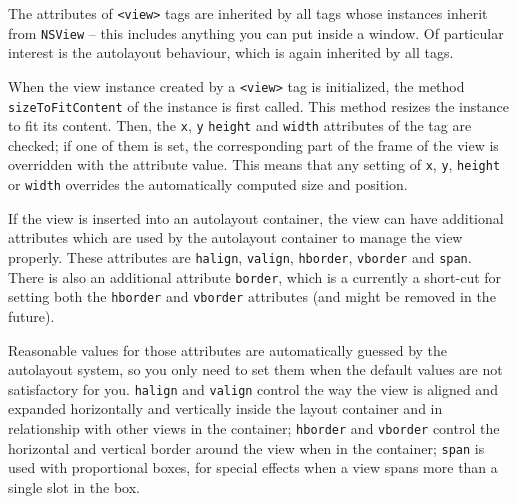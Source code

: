 The attributes of \texttt{<view>} tags are inherited by all tags whose
instances inherit from \texttt{NSView} -- this includes anything you
can put inside a window.  Of particular interest is the autolayout
behaviour, which is again inherited by all tags.

When the view instance created by a \texttt{<view>} tag is
initialized, the method \texttt{sizeToFitContent} of the instance is
first called.  This method resizes the instance to fit its content.
Then, the \texttt{x}, \texttt{y} \texttt{height} and \texttt{width}
attributes of the tag are checked; if one of them is set, the
corresponding part of the frame of the view is overridden with the
attribute value.  This means that any setting of \texttt{x},
\texttt{y}, \texttt{height} or \texttt{width} overrides the
automatically computed size and position.

If the view is inserted into an autolayout container, the view can
have additional attributes which are used by the autolayout container
to manage the view properly.  These attributes are \texttt{halign},
\texttt{valign}, \texttt{hborder}, \texttt{vborder} and \texttt{span}.  
There is also an additional attribute \texttt{border}, which is a
currently a short-cut for setting both the \texttt{hborder} and
\texttt{vborder} attributes (and might be removed in the future).

Reasonable values for those attributes are automatically guessed by
the autolayout system, so you only need to set them when the default
values are not satisfactory for you.  \texttt{halign} and
\texttt{valign} control the way the view is aligned and expanded 
horizontally and vertically inside the layout container and in
relationship with other views in the container; \texttt{hborder} and
\texttt{vborder} control the horizontal and vertical border around the
view when in the container; \texttt{span} is used with proportional
boxes, for special effects when a view spans more than a single slot
in the box.

